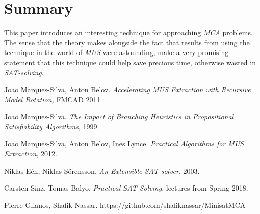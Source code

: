 \documentclass[]{article}
\begin{document}
	\section{Summary}
	This paper introduces an interesting technique for approaching \textit{MCA} problems. The sense that the theory makes alongside the fact that results from using the technique in the world of \textit{MUS} were astounding\cite{Rotation}, make a very promising statement that this technique could help save precious time, otherwise wasted in \textit{SAT-solving}. 
	\pagebreak
	\begin{thebibliography}{9}
		
			Joao Marques-Silva,
			Anton Belov.
			\textit{Accelerating MUS Extraction with Recursive Model Rotation,}
			FMCAD 2011
			
			Joao Marques-Silva.
			\textit{The Impact of Branching Heuristics in Propositional Satisfiability Algorithms},
			1999.
			
			Joao Marques-Silva,
			 Anton Belov,
			 Ines Lynce.
			\textit{Practical Algorithms for MUS Extraction},
			2012.
			
			Niklas Eén,
			Niklas Sörensson.
			\textit{An Extensible SAT-solver},
			2003.
			
		    Carsten Sinz,
		    Tomas Balyo.
		    \textit{Practical SAT-Solving}, lectures from Spring 2018.
		    
			Pierre Glianos,
			Shafik Nassar.
			https://github.com/shafiknassar/MinisatMCA
			
		
		
	\end{thebibliography}
\end{document}
